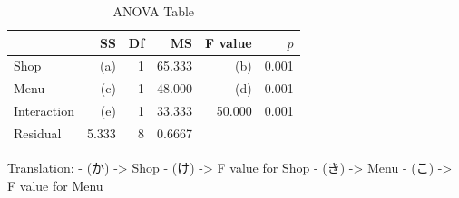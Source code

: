 \begin{table}[ht]
	\centering
	\caption{ANOVA Table}
	\begin{tabular}{lrrrrr}
		\hline
		            & SS    & Df & MS     & F value & $p$   \\
		\hline
		Shop        & (a)   & 1  & 65.333 & (b)     & 0.001 \\
		Menu        & (c)   & 1  & 48.000 & (d)     & 0.001 \\
		Interaction & (e)   & 1  & 33.333 & 50.000  & 0.001 \\
		Residual    & 5.333 & 8  & 0.6667 &         &       \\
		\hline
	\end{tabular}
	\label{Example2Ans}
\end{table}

Translation:
- (か) -> Shop
- (け) -> F value for Shop
- (き) -> Menu
- (こ) -> F value for Menu
